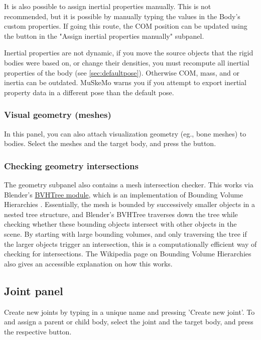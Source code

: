 \documentclass{article}
\begin{document}
It is also possible to assign inertial properties manually. This is not recommended, but it is possible by manually typing the values in the Body's custom properties. If going this route, the COM position can be updated using the button in the "Assign inertial properties manually" subpanel.


Inertial properties are not dynamic, if you move the source objects that the rigid bodies were based on, or change their densities, you must recompute all inertial properties of the body (see \ref{sec:defaultpose}). Otherwise COM, mass, and or inertia can be outdated. MuSkeMo warns you if you attempt to export inertial property data in a different pose than the default pose.

\subsubsection{Visual geometry (meshes)}
In this panel, you can also attach visualization geometry (eg., bone meshes) to bodies. Select the meshes and the target body, and press the button.

\subsubsection{Checking geometry intersections}
The geometry subpanel also contains a mesh intersection checker. This works via Blender's \href{https://docs.blender.org/api/current/mathutils.bvhtree.html}{BVHTree module}, which is an implementation of Bounding Volume Hierarchies \cite{ericsonBoundingVolumeHierarchies2005}. Essentially, the mesh is bounded by successively smaller objects in a nested tree structure, and Blender's BVHTree traverses down the tree while checking whether these bounding objects intersect with other objects in the scene. By starting with large bounding volumes, and only traversing the tree if the larger objects trigger an intersection, this is a computationally efficient way of checking for intersections. The Wikipedia page on Bounding Volume Hierarchies also gives an accessible explanation on how this works.


\subsection{Joint panel}
\label{sec:jointpanel}

Create new joints by typing in a unique name and pressing 'Create new joint'. To and assign a parent or child body, select the joint and the target body, and press the respective button. 
\end{document}
